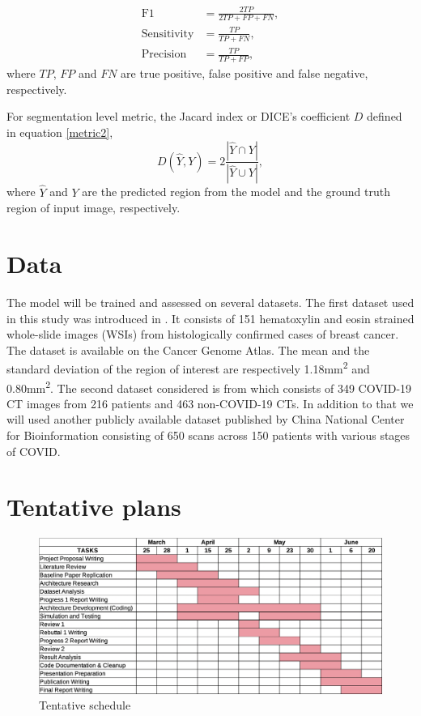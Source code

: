 \documentclass[final]{cvpr}
\begin{document}
\begin{equation}
\begin{split}
   \text{F1} & = \frac{2TP}{2TP+FP+ FN}, \\
   \text{Sensitivity} & = \frac{TP}{TP+FN}, \\
   \text{Precision} & = \frac{TP}{TP+FP} ,
   \label{metric1}
\end{split}
\end{equation}
where $TP$, $FP$ and $FN$ are true positive, false positive and false negative, respectively.

For segmentation level metric, the Jacard index or DICE's coefficient $D$ defined in equation \ref{metric2},
\begin{equation}
    D(\hat{Y},Y)=2\frac{|\hat{Y} \cap Y|}{|\hat{Y} \cup Y|},
    \label{metric2}
\end{equation}
where $\hat{Y}$ and $Y$ are the predicted region from the model and the ground truth region of input image, respectively.

\section{Data}
The model will be trained and assessed on several datasets. The first dataset used in this study was introduced in \cite{10.1093/bioinformatics/btz083}. It consists of 151 hematoxylin and eosin strained whole-slide images (WSIs) from histologically confirmed cases of breast cancer. The dataset is available on the Cancer Genome Atlas. The mean and the standard deviation of the region of interest are respectively 1.18mm\textsuperscript{2} and 0.80mm\textsuperscript{2}. The second dataset considered is from \cite{zhao2020COVID-CT-Dataset} which consists of 349 COVID-19 CT images from 216 patients and 463 non-COVID-19 CTs. In addition to that we will used another publicly available dataset published by China National Center for Bioinformation \cite{Gunraj2020} consisting of 650 scans across 150 patients with various stages of COVID.

\newpage 
\section{Tentative plans}
\begin{figure}[h!]
\begin{center}
   \includegraphics[width=1.0\linewidth]{media/chart.png}
\end{center}
   \caption{Tentative schedule}
\label{fig:schedule}
\end{figure}
\end{document}
